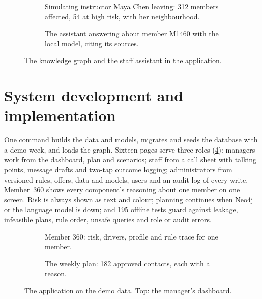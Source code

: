 \documentclass[paper=a4, fontsize=11pt, open=any, parskip=half-,
  headings=small, numbers=noenddot, captions=tableheading, toc=flat]{scrreprt}
\begin{document}
\begin{figure}[!htb]
  \centering
  \begin{subfigure}[t]{0.495\linewidth}
    \caption{Simulating instructor Maya Chen leaving: 312 members affected, 54 at high risk, with her neighbourhood.}
    \label{fig:kgsim}
  \end{subfigure}\hfill
  \begin{subfigure}[t]{0.495\linewidth}
    \caption{The assistant answering about member M1460 with the local  model, citing its sources.}
    \label{fig:assistant}
  \end{subfigure}
  \caption{The knowledge graph and the staff assistant in the application.}
\end{figure}
\section{System development and implementation}
\label{sec:impl}

One command builds the data and models, migrates and seeds the database with a demo week, and loads the graph. Sixteen pages serve three roles (\cref{fig:screens}): managers work from the dashboard, plan and scenarios; staff from a call sheet with talking points, message drafts and two-tap outcome logging; administrators from versioned rules, offers, data and models, users and an audit log of every write. Member~360 shows every component's reasoning about one member on one screen. Risk is always shown as text and colour; planning continues when Neo4j or the language model is down; and 195 offline tests guard against leakage, infeasible plans, rule order, unsafe queries and role or audit errors.

\begin{figure}[!htb]
  \centering
  \par\medskip
  \begin{subfigure}[t]{0.495\linewidth}
    \caption{Member 360: risk, drivers, profile and rule trace for one member.}
  \end{subfigure}\hfill
  \begin{subfigure}[t]{0.495\linewidth}
    \caption{The weekly plan: 182 approved contacts, each with a reason.}
  \end{subfigure}
  \caption{The application on the demo data. Top: the manager's dashboard.}
  \label{fig:screens}
\end{figure}
\end{document}
